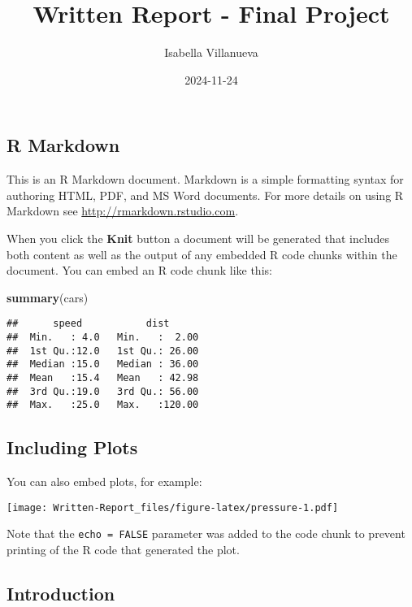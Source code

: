 \documentclass[
]{article}
\title{Written Report - Final Project}
\author{Isabella Villanueva}
\date{2024-11-24}
\newenvironment{Shaded}{\begin{snugshade}}{\end{snugshade}}
\newcommand{\FunctionTok}[1]{\textcolor[rgb]{0.13,0.29,0.53}{\textbf{#1}}}
\newcommand{\NormalTok}[1]{#1}
\begin{document}
\maketitle

\subsection{R Markdown}\label{r-markdown}

This is an R Markdown document. Markdown is a simple formatting syntax
for authoring HTML, PDF, and MS Word documents. For more details on
using R Markdown see \url{http://rmarkdown.rstudio.com}.

When you click the \textbf{Knit} button a document will be generated
that includes both content as well as the output of any embedded R code
chunks within the document. You can embed an R code chunk like this:

\begin{Shaded}
\begin{Highlighting}[]
\FunctionTok{summary}\NormalTok{(cars)}
\end{Highlighting}
\end{Shaded}

\begin{verbatim}
##      speed           dist       
##  Min.   : 4.0   Min.   :  2.00  
##  1st Qu.:12.0   1st Qu.: 26.00  
##  Median :15.0   Median : 36.00  
##  Mean   :15.4   Mean   : 42.98  
##  3rd Qu.:19.0   3rd Qu.: 56.00  
##  Max.   :25.0   Max.   :120.00
\end{verbatim}

\subsection{Including Plots}\label{including-plots}

You can also embed plots, for example:

\texttt{[image: Written-Report\_files/figure-latex/pressure-1.pdf]}

Note that the \texttt{echo\ =\ FALSE} parameter was added to the code
chunk to prevent printing of the R code that generated the plot.

\subsection{Introduction}\label{introduction}
\end{document}
